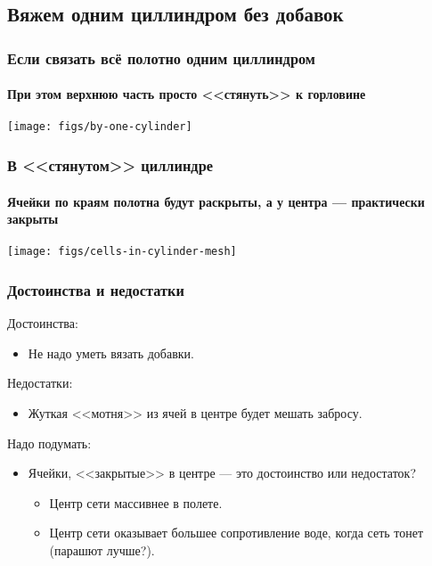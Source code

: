\subsection{Вяжем одним циллиндром без добавок}

\begin{frame}
    \frametitle{Если связать всё полотно одним циллиндром}
    \framesubtitle{При этом верхнюю часть просто <<стянуть>> к горловине}

    \begin{center}
        \texttt{[image: figs/by-one-cylinder]}
    \end{center}
\end{frame}

\begin{frame}
    \frametitle{В <<стянутом>> циллиндре}
    \framesubtitle{Ячейки по краям полотна будут раскрыты, а у центра --- практически закрыты}

    \begin{center}
        \texttt{[image: figs/cells-in-cylinder-mesh]}
    \end{center}
\end{frame}

\begin{frame}
    \frametitle{Достоинства и недостатки}
	
	Достоинства:
    \begin{itemize}
        \item Не надо уметь вязать добавки.
    \end{itemize}
	
	Недостатки:
    \begin{itemize}
        \item Жуткая <<мотня>> из ячей в центре будет мешать забросу.
    \end{itemize}
	
	Надо подумать:
    \begin{itemize}
        \item Ячейки, <<закрытые>> в центре --- это достоинство или недостаток?
		\begin{itemize}
			\item Центр сети массивнее в полете.
			\item Центр сети оказывает большее сопротивление воде, когда сеть тонет (парашют лучше?).
		\end{itemize}		
    \end{itemize}
\end{frame}



